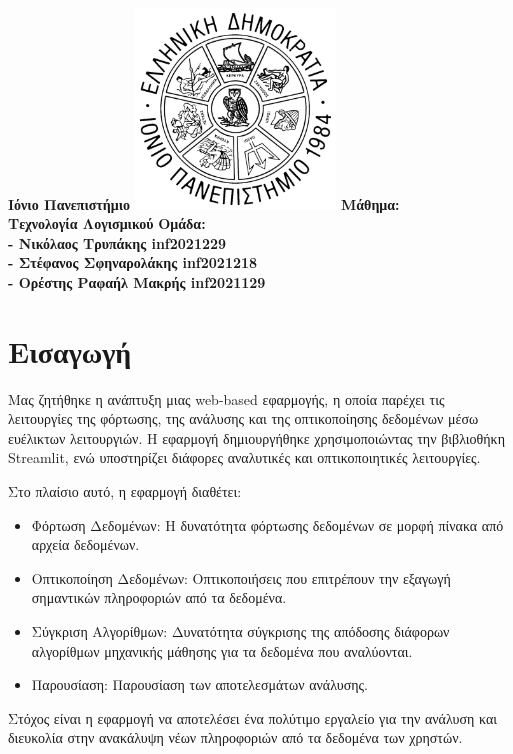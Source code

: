 \documentclass{article}
\begin{document}
    \fontsize{50pt}{35pt}\selectfont
    \vfill
    \fontsize{20pt}{20pt}\selectfont
    \textbf{Ιόνιο Πανεπιστήμιο}
    \includegraphics[width=0.4\textwidth]{photos/Ionian_University_seal.png}
    \vfill
    \fontsize{20pt}{20pt}\selectfont
    \textbf{Μάθημα: \\Τεχνολογία Λογισμικού}
    \vfill
    \fontsize{16pt}{16pt}\selectfont
    \textbf{Ομάδα: \\
    - Νικόλαος Τρυπάκης inf2021229\\
    - Στέφανος Σφηναρολάκης inf2021218\\
    - Ορέστης Ραφαήλ Μακρής inf2021129}

\newpage

\raggedright
\fontsize{15pt}{15pt}\selectfont
\tableofcontents

\newpage {}
\large
\raggedright
\section{Εισαγωγή}
Μας ζητήθηκε η ανάπτυξη μιας web-based εφαρμογής, η οποία παρέχει τις λειτουργίες της φόρτωσης, της ανάλυσης και της οπτικοποίησης δεδομένων μέσω ευέλικτων λειτουργιών. Η εφαρμογή δημιουργήθηκε χρησιμοποιώντας την βιβλιοθήκη Streamlit, ενώ υποστηρίζει διάφορες αναλυτικές και οπτικοποιητικές λειτουργίες.

Στο πλαίσιο αυτό, η εφαρμογή διαθέτει:
\begin{itemize}
    \item Φόρτωση Δεδομένων: Η δυνατότητα φόρτωσης δεδομένων σε μορφή πίνακα από αρχεία δεδομένων.
    \item Οπτικοποίηση Δεδομένων: Οπτικοποιήσεις που επιτρέπουν την εξαγωγή σημαντικών πληροφοριών από τα δεδομένα.
    \item Σύγκριση Αλγορίθμων: Δυνατότητα σύγκρισης της απόδοσης διάφορων αλγορίθμων μηχανικής μάθησης για τα δεδομένα που αναλύονται.
    \item Παρουσίαση: Παρουσίαση των αποτελεσμάτων ανάλυσης.
\end{itemize}
Στόχος είναι η εφαρμογή να αποτελέσει ένα πολύτιμο εργαλείο για την ανάλυση και διευκολία στην ανακάλυψη νέων πληροφοριών από τα δεδομένα των χρηστών.
\end{document}
